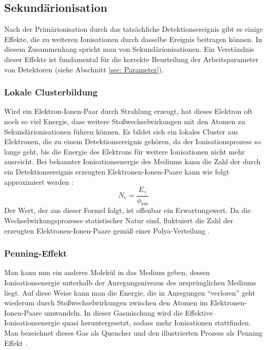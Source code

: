 		
	\newpage
	
	\subsection{Sekundärionisation}	\label{chap:Sekundär}
		Nach der Primärionisation durch das tatsächliche Detektionsereignis gibt es einige Effekte, die zu weiteren Ionisationen durch dasselbe Ereignis beitragen können. In diesem Zusammenhang spricht man von Sekundärionisationen. Ein Verständnis dieser Effekte ist fundamental für die korrekte Beurteilung der Arbeitsparameter von Detektoren (siehe Abschnitt \ref{sec: Parameter}).
		
		\subsubsection{Lokale Clusterbildung}
			Wird ein Elektron-Ionen-Paar durch Strahlung erzeugt, hat dieses Elektron oft noch so viel Energie, dass weitere Stoßwechselwirkungen mit den Atomen zu Sekundärionisationen führen können. Es bildet sich ein lokales Cluster aus Elektronen, die zu einem Detektionsereignis gehören, da der Ionisationsprozess so lange geht, bis die Energie des Elektrons für weitere Ionisationen nicht mehr ausreicht. Bei bekannter Ionisationsenergie des Mediums kann die Zahl der durch ein Detektionsereignis erzeugten Elektronen-Ionen-Paare kann wie folgt approximiert werden \cite{Sauli_Multiwire}:
			\begin{equation} \label{eq:Primärionisation}
				N_{\text{e}}=\frac{E_{\gamma}}{\phi_{\text{ion}}}
			\end{equation}	
			Der Wert, der aus dieser Formel folgt, ist offenbar ein Erwartungswert. Da die Wechselwirkungsprozesse statistischer Natur sind, fluktuiert die Zahl der erzeugten Elektronen-Ionen-Paare gemäß einer Polya-Verteilung \cite{ottnad}.
		
		\subsubsection{Penning-Effekt}
			Man kann nun ein anderes Molekül in das Medium geben, dessen Ionisationsenergie unterhalb der Anregungsniveaus des ursprünglichen Mediums liegt. Auf diese Weise kann man die Energie, die in Anregungen \enquote{verloren} geht wiederum durch Stoßwechselwirkungen zwischen den Atomen im Elektronen-Ionen-Paare umwandeln. In dieser Gasmischung wird die Effektive Ionisationsenergie quasi heruntergesetzt, sodass mehr Ionisationen stattfinden. Man bezeichnet dieses Gas als Quencher und den illustrierten Prozess als Penning Effekt \cite{ottnad}.
			
